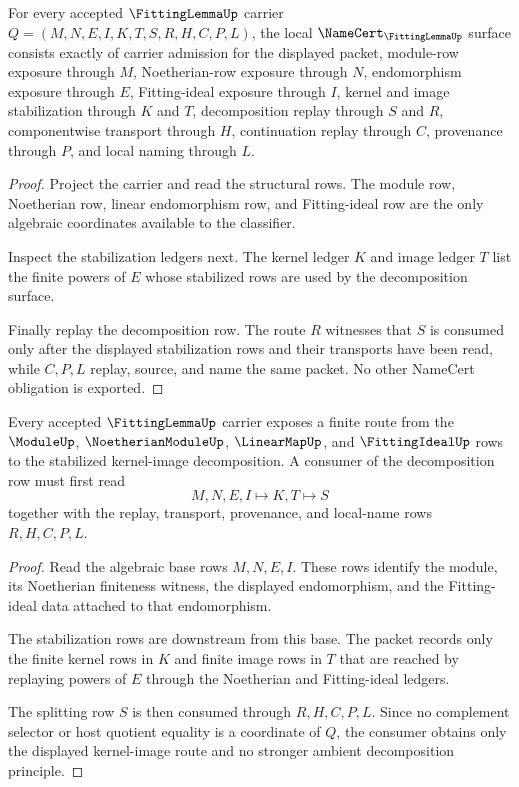 \begin{theorem}
\label{thm:fitting-lemma-namecert-obligations}
For every accepted $\FittingLemmaUp$ carrier $Q=(M,N,E,I,K,T,S,R,H,C,P,L)$, the local $\NameCert_{\FittingLemmaUp}$ surface consists exactly of carrier admission for the displayed packet, module-row exposure through $M$, Noetherian-row exposure through $N$, endomorphism exposure through $E$, Fitting-ideal exposure through $I$, kernel and image stabilization through $K$ and $T$, decomposition replay through $S$ and $R$, componentwise transport through $H$, continuation replay through $C$, provenance through $P$, and local naming through $L$.
\end{theorem}
\begin{proof}
Project the carrier and read the structural rows. The module row, Noetherian row, linear endomorphism row, and Fitting-ideal row are the only algebraic coordinates available to the classifier.

Inspect the stabilization ledgers next. The kernel ledger $K$ and image ledger $T$ list the finite powers of $E$ whose stabilized rows are used by the decomposition surface.

Finally replay the decomposition row. The route $R$ witnesses that $S$ is consumed only after the displayed stabilization rows and their transports have been read, while $C,P,L$ replay, source, and name the same packet. No other NameCert obligation is exported.
\end{proof}

\begin{theorem}
\label{thm:fitting-lemma-kernel-image-splitting-route}
Every accepted $\FittingLemmaUp$ carrier exposes a finite route from the $\ModuleUp$, $\NoetherianModuleUp$, $\LinearMapUp$, and $\FittingIdealUp$ rows to the stabilized kernel-image decomposition. A consumer of the decomposition row must first read
$$
M,N,E,I\longmapsto K,T\longmapsto S
$$
together with the replay, transport, provenance, and local-name rows $R,H,C,P,L$.
\end{theorem}
\begin{proof}
Read the algebraic base rows $M,N,E,I$. These rows identify the module, its Noetherian finiteness witness, the displayed endomorphism, and the Fitting-ideal data attached to that endomorphism.

The stabilization rows are downstream from this base. The packet records only the finite kernel rows in $K$ and finite image rows in $T$ that are reached by replaying powers of $E$ through the Noetherian and Fitting-ideal ledgers.

The splitting row $S$ is then consumed through $R,H,C,P,L$. Since no complement selector or host quotient equality is a coordinate of $Q$, the consumer obtains only the displayed kernel-image route and no stronger ambient decomposition principle.
\end{proof}

